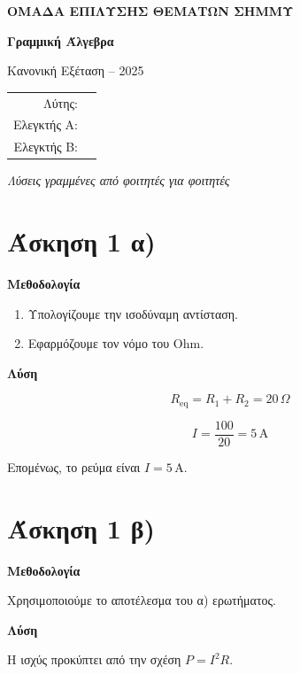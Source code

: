 \documentclass[a4paper,11pt]{article}
\begin{document}
\begin{titlepage}\centering\vspace*{2cm}
{\Large\color{accent}\bfseries ΟΜΑΔΑ ΕΠΙΛΥΣΗΣ ΘΕΜΑΤΩΝ ΣΗΜΜΥ\par}\vspace{2cm}
{\Huge\bfseries Γραμμική Άλγεβρα\par}\vspace{0.7cm}
{\Large Κανονική Εξέταση -- 2025\par}\vfill
\begin{tabular}{rl}Λύτης: &  \\
Ελεγκτής Α: &  \\
Ελεγκτής Β: & \end{tabular}
\vfill
{\itshape Λύσεις γραμμένες από φοιτητές για φοιτητές\par}\end{titlepage}
\section*{Άσκηση 1 α)}

\textbf{Μεθοδολογία}\par

\begin{enumerate}
\item Υπολογίζουμε την ισοδύναμη αντίσταση.
\item Εφαρμόζουμε τον νόμο του Ohm.
\end{enumerate}

\textbf{Λύση}\par

\[
R_{\mathrm{eq}} = R_1+R_2 = 20\,\Omega
\]

\[
I=\frac{100}{20}=5\,\mathrm{A}
\]

Επομένως, το ρεύμα είναι \(I=5\,\mathrm{A}\).\par

\section*{Άσκηση 1 β)}

\textbf{Μεθοδολογία}\par

Χρησιμοποιούμε το αποτέλεσμα του α) ερωτήματος.\par

\textbf{Λύση}\par

Η ισχύς προκύπτει από την σχέση \(P=I^2R\).\par
\end{document}
